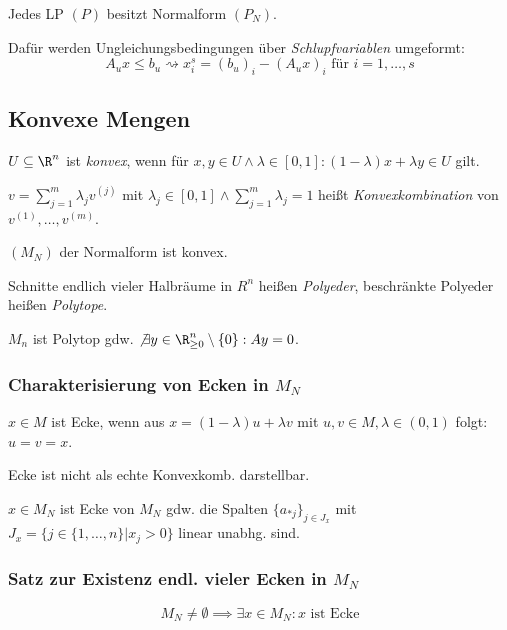 Jedes LP \((P)\) besitzt Normalform \((P_N)\).

Dafür werden Ungleichungsbedingungen über \emph{Schlupfvariablen} umgeformt:
\[ A_u x \leq b_u \rightsquigarrow x_i^s = (b_u)_i - (A_u x)_i \text{ für } i = 1,\dots,s \]

\subsection*{Konvexe Mengen}

\(U \subseteq \R^n\) ist \emph{konvex}, wenn für \(x, y \in U \land \lambda \in [0,1] : (1-\lambda)x + \lambda y \in U\) gilt.

\spacing

\( v = \sum_{j=1}^m \lambda_j v^{(j)} \) mit \( \lambda_j \in [0,1] \land \sum_{j=1}^m \lambda_j = 1\) heißt \emph{Konvexkombination} von \( v^{(1)}, \dots, v^{(m)} \).

\spacing

\((M_N)\) der Normalform ist konvex.

\spacing

Schnitte endlich vieler Halbräume in \(R^n\) heißen \emph{Polyeder}, beschränkte Polyeder heißen \emph{Polytope}.

\spacing

\(M_n\) ist Polytop gdw. \( \not\exists y \in \R_{\geq 0}^n \setminus \{0\} : Ay = 0 \).

\subsubsection*{Charakterisierung von Ecken in \(M_N\)}

\(x \in M\) ist Ecke, wenn aus \(x=(1-\lambda) u+\lambda v\) mit \(u, v \in M, \lambda \in (0,1)\) folgt: \( u = v = x \).

Ecke ist nicht als echte Konvexkomb. darstellbar.

\spacing

\( x \in M_N \) ist Ecke von \(M_N\) gdw. die Spalten \(\{a_{*j}\}_{j \in J_x}\) mit \(J_x = \{ j \in \{1,\dots,n\} | x_j > 0 \}\) linear unabhg. sind.

\subsubsection*{Satz zur Existenz endl. vieler Ecken in \(M_N\)}

\[ M_N \neq \emptyset \implies \exists x \in M_N : x \text{ ist Ecke} \]

